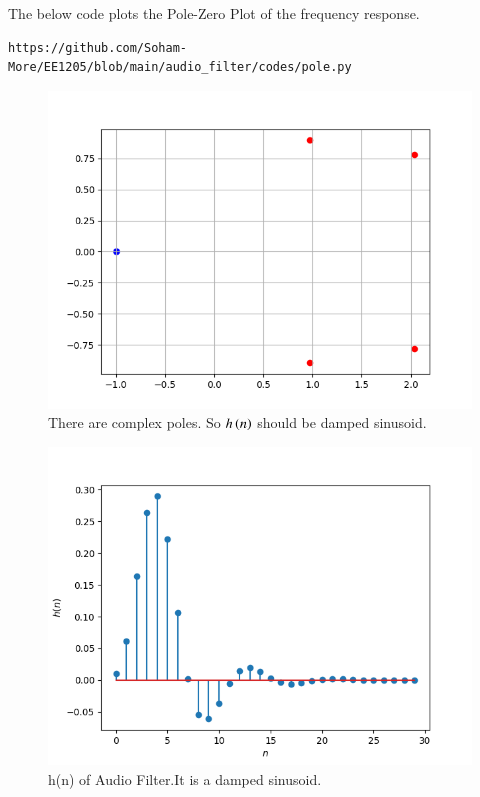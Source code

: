 \documentclass[journal,12pt,twocolumn]{IEEEtran}
\theoremstyle{remark}
\begin{document}
\begin{enumerate}[label=\thesection.\arabic*]
The below code plots the Pole-Zero Plot of the frequency response.
\begin{lstlisting}
https://github.com/Soham-More/EE1205/blob/main/audio_filter/codes/pole.py
\end{lstlisting}
\begin{figure}[ht]
\centering
\includegraphics[width=1\columnwidth]{figs/pole.png}
\caption{There are complex poles. So $h\left(n\right)$ should be damped sinusoid.}
\label{fig:pole_zero_6.2}
\end{figure}

\begin{figure}[h!]
    \centering
    \includegraphics[width=\columnwidth]{figs/filter_h_n.png}
    \caption{h(n) of Audio Filter.It is a damped sinusoid.}
    \label{fig:6.2_hn}
\end{figure}


\end{enumerate}
\end{document}
